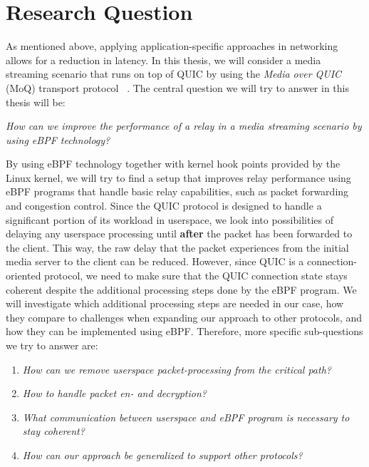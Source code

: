 \section{Research Question}\label{sec:research_question}

As mentioned above, applying application-specific approaches in networking allows for a reduction in latency.
In this thesis, we will consider a media streaming scenario that runs on top of QUIC by using the \textit{Media over QUIC} (MoQ) transport protocol
~\parencite{draft-moqtransport}.
The central question we will try to answer in this thesis will be:
\vspace{0.5cm}
\begin{center}
    \textit{How can we improve the performance of a relay in a media streaming scenario by using eBPF technology?}
\end{center}
\vspace{0.5cm}
By using eBPF technology together with kernel hook points provided by the Linux kernel, we will try to find a setup that improves relay 
performance using eBPF programs that handle basic relay capabilities, such as packet forwarding and congestion control.
Since the QUIC protocol is designed to handle a significant portion of its workload in userspace, we look into possibilities of delaying any 
userspace processing until \textbf{after} the packet has been forwarded to the client.
This way, the raw delay that the packet experiences from the initial media server to the client can be reduced. 
However, since QUIC is a connection-oriented protocol, we need to make sure that the QUIC connection state stays 
coherent despite the additional processing steps done by the eBPF program.
We will investigate which additional processing steps are needed in our case, how they compare to challenges when expanding our approach to other protocols, 
and how they can be implemented using eBPF\@.
Therefore, more specific sub-questions we try to answer are:
\vspace{0.5cm}
\begin{enumerate}
    \item \textit{How can we remove userspace packet-processing from the critical path?}
    \item \textit{How to handle packet en- and decryption?}
    \item \textit{What communication between userspace and eBPF program is necessary to stay coherent?}
    \item \textit{How can our approach be generalized to support other protocols?}
\end{enumerate}
\vspace{0.5cm}